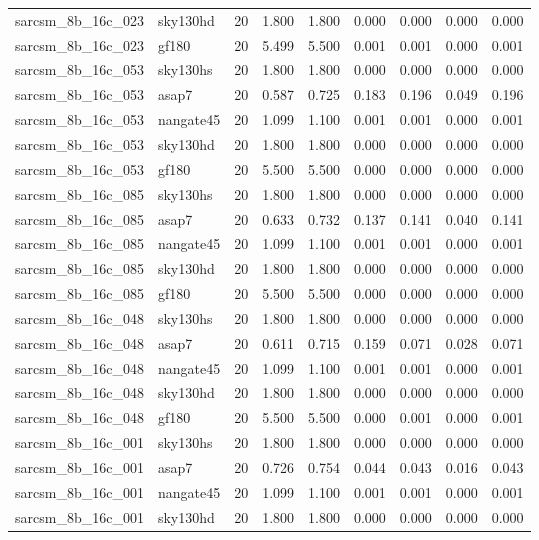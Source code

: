 \begin{tabular}{llrrrrrrr}
sarcsm\_8b\_16c\_023 & sky130hd & 20 & 1.800 & 1.800 & 0.000 & 0.000 & 0.000 & 0.000 \\
sarcsm\_8b\_16c\_023 & gf180 & 20 & 5.499 & 5.500 & 0.001 & 0.001 & 0.000 & 0.001 \\
sarcsm\_8b\_16c\_053 & sky130hs & 20 & 1.800 & 1.800 & 0.000 & 0.000 & 0.000 & 0.000 \\
sarcsm\_8b\_16c\_053 & asap7 & 20 & 0.587 & 0.725 & 0.183 & 0.196 & 0.049 & 0.196 \\
sarcsm\_8b\_16c\_053 & nangate45 & 20 & 1.099 & 1.100 & 0.001 & 0.001 & 0.000 & 0.001 \\
sarcsm\_8b\_16c\_053 & sky130hd & 20 & 1.800 & 1.800 & 0.000 & 0.000 & 0.000 & 0.000 \\
sarcsm\_8b\_16c\_053 & gf180 & 20 & 5.500 & 5.500 & 0.000 & 0.000 & 0.000 & 0.000 \\
sarcsm\_8b\_16c\_085 & sky130hs & 20 & 1.800 & 1.800 & 0.000 & 0.000 & 0.000 & 0.000 \\
sarcsm\_8b\_16c\_085 & asap7 & 20 & 0.633 & 0.732 & 0.137 & 0.141 & 0.040 & 0.141 \\
sarcsm\_8b\_16c\_085 & nangate45 & 20 & 1.099 & 1.100 & 0.001 & 0.001 & 0.000 & 0.001 \\
sarcsm\_8b\_16c\_085 & sky130hd & 20 & 1.800 & 1.800 & 0.000 & 0.000 & 0.000 & 0.000 \\
sarcsm\_8b\_16c\_085 & gf180 & 20 & 5.500 & 5.500 & 0.000 & 0.000 & 0.000 & 0.000 \\
sarcsm\_8b\_16c\_048 & sky130hs & 20 & 1.800 & 1.800 & 0.000 & 0.000 & 0.000 & 0.000 \\
sarcsm\_8b\_16c\_048 & asap7 & 20 & 0.611 & 0.715 & 0.159 & 0.071 & 0.028 & 0.071 \\
sarcsm\_8b\_16c\_048 & nangate45 & 20 & 1.099 & 1.100 & 0.001 & 0.001 & 0.000 & 0.001 \\
sarcsm\_8b\_16c\_048 & sky130hd & 20 & 1.800 & 1.800 & 0.000 & 0.000 & 0.000 & 0.000 \\
sarcsm\_8b\_16c\_048 & gf180 & 20 & 5.500 & 5.500 & 0.000 & 0.001 & 0.000 & 0.001 \\
sarcsm\_8b\_16c\_001 & sky130hs & 20 & 1.800 & 1.800 & 0.000 & 0.000 & 0.000 & 0.000 \\
sarcsm\_8b\_16c\_001 & asap7 & 20 & 0.726 & 0.754 & 0.044 & 0.043 & 0.016 & 0.043 \\
sarcsm\_8b\_16c\_001 & nangate45 & 20 & 1.099 & 1.100 & 0.001 & 0.001 & 0.000 & 0.001 \\
sarcsm\_8b\_16c\_001 & sky130hd & 20 & 1.800 & 1.800 & 0.000 & 0.000 & 0.000 & 0.000 \\

\end{tabular}
